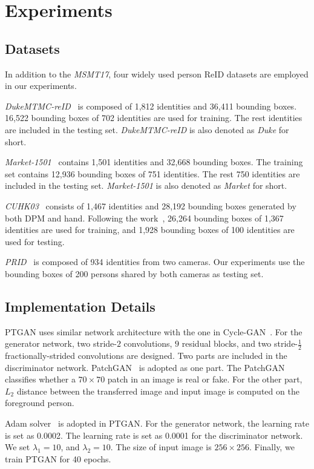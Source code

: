 \documentclass[10pt,twocolumn,letterpaper]{article}
\begin{document}
\section{Experiments}

\subsection{Datasets}
In addition to the \emph{MSMT17}, four widely used person ReID datasets are employed in our experiments.

\emph{DukeMTMC-reID}~\cite{zheng2017unlabeled} is composed of 1,812 identities and 36,411 bounding boxes. 16,522 bounding boxes of 702 identities are used for training. The rest identities are included in the testing set. \emph{DukeMTMC-reID} is also denoted as \emph{Duke} for short.

\emph{Market-1501}~\cite{zheng2015scalable} contains 1,501 identities and 32,668 bounding boxes. The training set contains 12,936 bounding boxes of 751 identities. The rest 750 identities are included in the testing set. \emph{Market-1501} is also denoted as \emph{Market} for short.

\emph{CUHK03}~\cite{li2014deepreid} consists of 1,467 identities and 28,192 bounding boxes generated by both DPM and hand. Following the work~\cite{xiao2016learning},  26,264 bounding boxes of 1,367 identities are used for training, and 1,928 bounding boxes of 100 identities are used for testing.

\emph{PRID}~\cite{hirzer2011person} is composed of 934 identities from two cameras. Our experiments use the bounding boxes of 200 persons shared by both cameras as testing set.


\subsection{Implementation Details}
PTGAN uses similar network architecture with the one in Cycle-GAN~\cite{zhu2017unpaired}. For the generator network, two stride-$2$ convolutions, $9$ residual blocks, and two stride-$\frac{1}{2}$ fractionally-strided convolutions are designed. Two parts are included in the discriminator network. PatchGAN~\cite{isola2016image} is adopted as one part. The PatchGAN classifies whether a $70 \times 70$ patch in an image is real or fake. For the other part, $L_2$ distance between the transferred image and input image is computed on the foreground person.

Adam solver~\cite{kinga2015method} is adopted in PTGAN. For the generator network, the learning rate is set as 0.0002. The learning rate is set as 0.0001 for the discriminator network. We set $\lambda_{1} = 10$, and $\lambda_{2}=10$. The size of input image is $256 \times 256$. Finally, we train PTGAN for 40 epochs.
\end{document}
